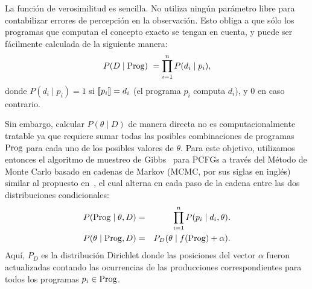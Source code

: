 
La función de verosimilitud es sencilla. No utiliza ningún parámetro libre para contabilizar errores de percepción en la observación. Esto obliga a que sólo los programas que computan el concepto exacto se tengan en cuenta, y puede ser fácilmente calculada de la siguiente manera:
%
\begin{equation*}
\label{eqD}
P(D \mid {\rm Prog})\ = \prod\limits_{i = 1}^n P(d_i \mid p_i),
\end{equation*}
%
donde $P(d_i \mid p_i) = 1 $ si $\llbracket p_i\rrbracket = d_i$ (el programa $p_i$ computa $d_i$), y 0 en caso contrario. 

Sin embargo, calcular $P(\theta \mid D)$ de manera directa no es computacionalmente tratable ya que requiere sumar todas las posibles combinaciones de programas ${\rm Prog}$ para cada uno de los posibles valores de $\theta$. Para este objetivo, utilizamos entonces el algoritmo de muestreo de Gibbs~\cite{geman1984stochastic} para PCFGs a través del Método de Monte Carlo basado en cadenas de Markov (MCMC, por sus siglas en inglés) similar al propuesto en~\cite{johnson2007bayesian}, el cual alterna en cada paso de la cadena entre las dos distribuciones condicionales: 
%
\begin{eqnarray*}
\label{eqE}
P({\rm Prog} \mid \theta, D) &=& \prod\limits_{i=1}^n P(p_i \mid d_i, \theta).\\
P(\theta \mid {\rm Prog}, D) &=& P_D(\theta \mid f({\rm Prog}) + \alpha).
\end{eqnarray*}
Aquí, $P_D$ es la distribución Dirichlet donde las posiciones del vector $\alpha$ fueron actualizadas contando las ocurrencias de las producciones correspondientes para todos los programas $p_i \in {\rm Prog}$.

